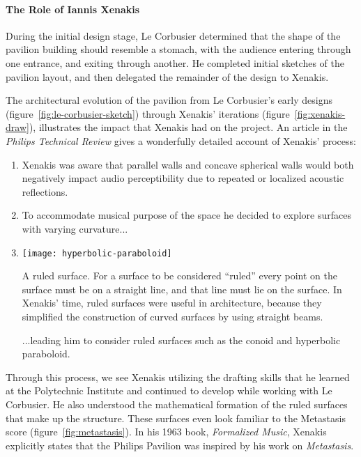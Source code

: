 \paragraph{The Role of Iannis Xenakis} During the initial design stage,
Le Corbusier determined that the shape of the pavilion building should
resemble a stomach, with the audience entering through one entrance,
and exiting through another. He completed initial sketches of the
pavilion layout, and then delegated the remainder of the design to
Xenakis.\cite{Clarke2012}

The architectural evolution of the pavilion from Le Corbusier's early
designs (figure~\ref{fig:le-corbusier-sketch}) through Xenakis'
iterations (figure~\ref{fig:xenakis-draw}), illustrates the impact
that Xenakis had on the project. An article in the \textit{Philips
  Technical Review}\cite{philips1958} gives a wonderfully detailed
account of Xenakis' process:
\begin{enumerate}
\item Xenakis was aware that parallel walls and concave spherical
  walls would both negatively impact audio perceptibility due to repeated
  or localized acoustic reflections.
\item To accommodate musical purpose of the space he decided to
  explore surfaces with varying curvature...
\item 
  \begin{marginfigure}
    \texttt{[image: hyperbolic-paraboloid]}
    \caption{A ruled surface. For a surface to be considered ``ruled''
      every point on the surface must be on a straight line, and that
      line must lie on the surface. In Xenakis' time, ruled surfaces
      were useful in architecture, because they simplified the
      construction of curved surfaces by using straight beams.}
    \label{fig:ruled-surface}
  \end{marginfigure}...leading him to consider ruled surfaces such as
  the conoid and hyperbolic paraboloid. 
\end{enumerate}
Through this process, we see Xenakis utilizing the drafting skills
that he learned at the Polytechnic Institute and continued to develop
while working with Le Corbusier. He also understood the mathematical
formation of the ruled surfaces that make up the structure. These
surfaces even look familiar to the Metastasis score
(figure~\ref{fig:metastasis}). In his 1963 book, \textit{Formalized
  Music}, Xenakis explicitly states that the Philips Pavilion was
inspired by his work on \textit{Metastasis}.

